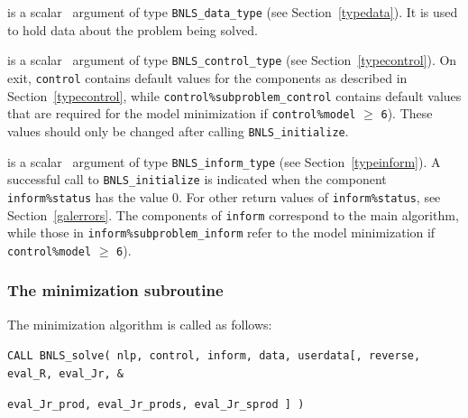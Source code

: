 \documentclass{galahad}
\newcommand{\packagename}{BNLS}
\begin{document}
\vspace*{-3mm}
\begin{description}

 is a scalar \intentinout\ argument of type
{\tt \packagename\_data\_type}
(see Section~\ref{typedata}). It is used to hold data about the problem being
solved.

 is a scalar \intentout\ argument of type
{\tt \packagename\_control\_type}
(see Section~\ref{typecontrol}).
On exit, {\tt control} contains default values for the components as
described in Section~\ref{typecontrol}, while
{\tt control\%subproblem\_control} contains default values that are required for the
model minimization if {\tt control\%model} $\geq$ {\tt 6}).
These values should only be changed after calling
{\tt \packagename\_initialize}.

 is a scalar \intentout\ argument of type
{\tt \packagename\_inform\_type}
(see Section~\ref{typeinform}). A successful call to
{\tt \packagename\_initialize}
is indicated when the  component {\tt inform\%status} has the value 0.
For other return values of {\tt inform\%status}, see
Section~\ref{galerrors}.
The components of {\tt inform} correspond to the main algorithm, while
those in {\tt inform\%subproblem\_inform} refer to the model minimization
if {\tt control\%model} $\geq$ {\tt 6}).

\end{description}


\subsubsection{The minimization subroutine}
The minimization algorithm is called as follows:
\vspace*{1mm}

\hspace{8mm}
{\tt CALL \packagename\_solve( nlp, control, inform, data, userdata[, 
   reverse, eval\_R, eval\_Jr, \hspace{3mm}                  \&}
\vspace*{-5mm}

\hspace{37mm}
{\tt eval\_Jr\_prod, eval\_Jr\_prods,  eval\_Jr\_sprod ] )}
\end{document}
